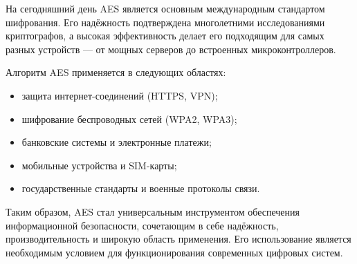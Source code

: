 На сегодняшний день AES является основным международным стандартом шифрования. Его надёжность подтверждена многолетними исследованиями криптографов, а высокая эффективность делает его подходящим для самых разных устройств — от мощных серверов до встроенных микроконтроллеров.  

Алгоритм AES применяется в следующих областях:  
\begin{itemize}
	\item защита интернет-соединений (HTTPS, VPN);  
	\item шифрование беспроводных сетей (WPA2, WPA3);  
	\item банковские системы и электронные платежи;  
	\item мобильные устройства и SIM-карты;  
	\item государственные стандарты и военные протоколы связи.  
\end{itemize}

Таким образом, AES стал универсальным инструментом обеспечения информационной безопасности, сочетающим в себе надёжность, производительность и широкую область применения. Его использование является необходимым условием для функционирования современных цифровых систем.  
